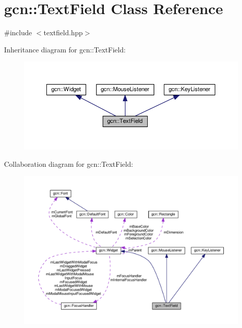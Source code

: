 \hypertarget{classgcn_1_1TextField}{}\section{gcn\+:\+:Text\+Field Class Reference}
\label{classgcn_1_1TextField}


{\ttfamily \#include $<$textfield.\+hpp$>$}



Inheritance diagram for gcn\+:\+:Text\+Field\+:\nopagebreak
\begin{figure}[H]
\begin{center}
\leavevmode
\includegraphics[width=350pt]{classgcn_1_1TextField__inherit__graph}
\end{center}
\end{figure}


Collaboration diagram for gcn\+:\+:Text\+Field\+:\nopagebreak
\begin{figure}[H]
\begin{center}
\leavevmode
\includegraphics[width=350pt]{classgcn_1_1TextField__coll__graph}
\end{center}
\end{figure}
